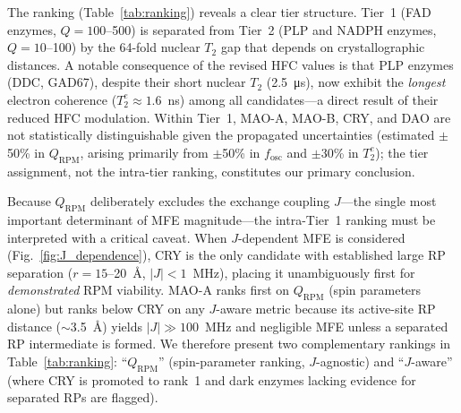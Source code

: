 \documentclass[11pt]{article}
\begin{document}
The ranking (Table~\ref{tab:ranking}) reveals a clear tier structure. Tier~1 (FAD enzymes, $Q = 100$--500) is separated from Tier~2 (PLP and NADPH enzymes, $Q = 10$--100) by the 64-fold nuclear $T_2$ gap that depends on crystallographic distances. A notable consequence of the revised HFC values is that PLP enzymes (DDC, GAD67), despite their short nuclear $T_2$ (2.5~\si{\micro\second}), now exhibit the \emph{longest} electron coherence ($T_2^e \approx 1.6$~ns) among all candidates---a direct result of their reduced HFC modulation. Within Tier~1, MAO-A, MAO-B, CRY, and DAO are not statistically distinguishable given the propagated uncertainties (estimated $\pm$50\% in $Q_\mathrm{RPM}$, arising primarily from $\pm$50\% in $f_\mathrm{osc}$ and $\pm$30\% in $T_2^e$); the tier assignment, not the intra-tier ranking, constitutes our primary conclusion.

Because $Q_\mathrm{RPM}$ deliberately excludes the exchange coupling $J$---the single most important determinant of MFE magnitude---the intra-Tier~1 ranking must be interpreted with a critical caveat. When $J$-dependent MFE is considered (Fig.~\ref{fig:J_dependence}), CRY is the only candidate with established large RP separation ($r = 15$--20~\AA, $|J| < 1$~MHz\cite{Hiscock2016}), placing it unambiguously first for \emph{demonstrated} RPM viability. MAO-A ranks first on $Q_\mathrm{RPM}$ (spin parameters alone) but ranks below CRY on any $J$-aware metric because its active-site RP distance ($\sim$3.5~\AA) yields $|J| \gg 100$~MHz and negligible MFE unless a separated RP intermediate is formed. We therefore present two complementary rankings in Table~\ref{tab:ranking}: ``$Q_\mathrm{RPM}$'' (spin-parameter ranking, $J$-agnostic) and ``$J$-aware'' (where CRY is promoted to rank~1 and dark enzymes lacking evidence for separated RPs are flagged).
\end{document}
